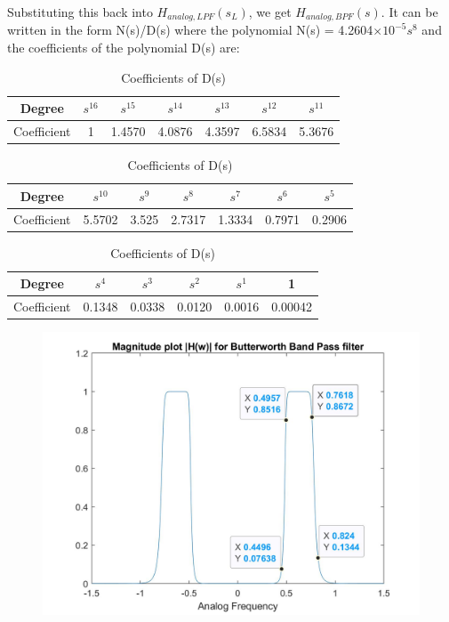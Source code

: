\documentclass[12pt]{article}
\begin{document}
	\noindent Substituting this back into $H_{analog,LPF}(s_L)$, we get $H_{analog,BPF}(s)$. It can be written in the form N(s)/D(s) where the polynomial N(s) = 4.2604$\times$$10^{-5} s^{8}$ and the coefficients of the polynomial D(s) are:
	\begin{table}[H]
			\begin{center}
			\begin{tabular}{ |c|c|c|c|c|c|c| } 
				\hline
				Degree & $s^{16}$ & $s^{15}$ & $s^{14}$ & $s^{13}$&$s^{12}$ & $s^{11}$\\ 
				\hline
				Coefficient & 1 & 1.4570 & 4.0876 & 4.3597 & 6.5834 & 5.3676 \\
				\hline
			\end{tabular}
		\end{center}
		\begin{center}
			\begin{tabular}{ |c|c|c|c|c|c|c| } 
				\hline
				Degree & $s^{10}$ & $s^{9}$ & $s^{8}$ & $s^{7}$ & $s^{6}$& $s^{5}$\\ 
				\hline
				Coefficient & 5.5702 & 3.525 & 2.7317 & 1.3334 & 0.7971 &	0.2906\\
				\hline
			\end{tabular}
		\end{center}
		\begin{center}
			\begin{tabular}{|c|c|c|c|c|c|} 
				\hline
				Degree  & $s^{4}$ & $s^{3}$ & $s^{2}$& $s^{1}$&1\\ 
				\hline
				Coefficient & 0.1348 & 0.0338 & 0.0120 & 0.0016 & 0.00042\\
				\hline
			\end{tabular}
		\end{center}
		\caption{Coefficients of D(s)}
		\label{Table 1: }	

	\end{table}
	
	\begin{figure}[H]
		\centering
		\includegraphics[width = 12cm]{Filter1ABPF.jpg}
	\end{figure}
\end{document}
